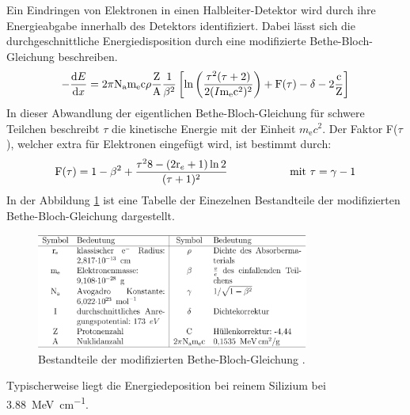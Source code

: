 Ein Eindringen von Elektronen in einen Halbleiter-Detektor wird durch
ihre Energieabgabe innerhalb des Detektors identifiziert. Dabei lässt sich die
durchgeschnittliche Energiedisposition durch eine modifizierte Bethe-Bloch-Gleichung
beschreiben.
\begin{equation*}
  -\frac{\text{d}E}{\text{d}x} =
  2\pi \text{N}_\text{a} \text{m}_\text{e} \text{c}\rho \frac{\text{Z}}{\text{A}}\frac{1}{\beta^2}
  \left[\text{ln}\left(\frac{\tau^2(\tau + 2)}{2(I\/\text{m}_\text{e}\text{c}^2)^2}\right)
  + \text{F}(\tau) - \delta - 2\frac{\text{c}}{\text{Z}}\right]
\end{equation*}
In dieser Abwandlung der eigentlichen Bethe-Bloch-Gleichung für schwere Teilchen
beschreibt $\tau$ die kinetische Energie mit der Einheit $m_\text{e} c^2$. Der
Faktor F($\tau$), welcher extra für Elektronen eingefügt wird, ist bestimmt durch:
\begin{equation*}
  \text{F}(\tau) = 1 - \beta^2 + \frac{\tau^2\/8 - (2\text{r}_e + 1) \ln2}{(\tau + 1)^2}
  \hspace{2cm}\text{mit } \tau = \gamma - 1
\end{equation*}
In der Abbildung \ref{fig:tab} ist eine Tabelle der Einezelnen Bestandteile der
modifizierten Bethe-Bloch-Gleichung dargestellt.
\begin{figure}[htb]
  \centering
  \includegraphics[width=0.8\textwidth]{images/Tabelle.png}
  \caption{Bestandteile der modifizierten Bethe-Bloch-Gleichung \cite{anleitung}.}
  \label{fig:tab}
\end{figure}
Typischerweise liegt die Energiedeposition bei reinem Silizium bei
\SI{3.88}{\mega\electronvolt\per\centi\meter}.

\FloatBarrier

